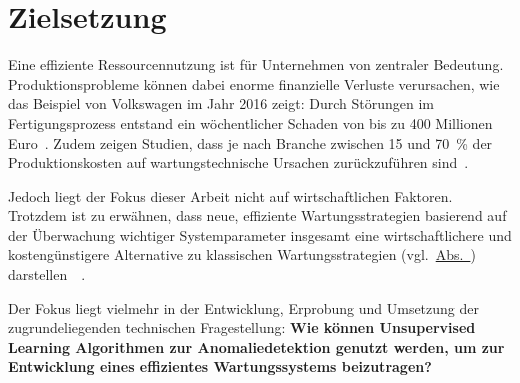 \chapter{Zielsetzung}\label{ch:zielsetzung}
Eine effiziente Ressourcennutzung ist für Unternehmen von zentraler Bedeutung. Produktionsprobleme können dabei enorme finanzielle
Verluste verursachen, wie das Beispiel von Volkswagen im Jahr 2016 zeigt: Durch Störungen im Fertigungsprozess entstand ein wöchentlicher
Schaden von bis zu 400 Millionen Euro~\cite{Krupitzer2020}. Zudem zeigen Studien, dass je nach Branche zwischen 15 und 70~\% der
Produktionskosten auf wartungstechnische Ursachen zurückzuführen sind~\cite{Bevilacqua2000}.

Jedoch liegt der Fokus dieser Arbeit nicht auf wirtschaftlichen Faktoren. Trotzdem ist zu erwähnen, dass neue, effiziente
Wartungsstrategien basierend auf der Überwachung wichtiger Systemparameter insgesamt eine wirtschaftlichere und kostengünstigere
Alternative zu klassischen Wartungsstrategien (vgl.~\hyperref[sec:trad_maintenance]{Abs.~})
darstellen~\cite{Deloux2009}~\Cite[S.~64--65]{Mobley2002}.

Der Fokus liegt vielmehr in der Entwicklung, Erprobung und Umsetzung der zugrundeliegenden technischen Fragestellung: \textbf{Wie können
Unsupervised Learning Algorithmen zur Anomaliedetektion genutzt werden, um zur Entwicklung eines effizientes Wartungssystems
beizutragen?}

